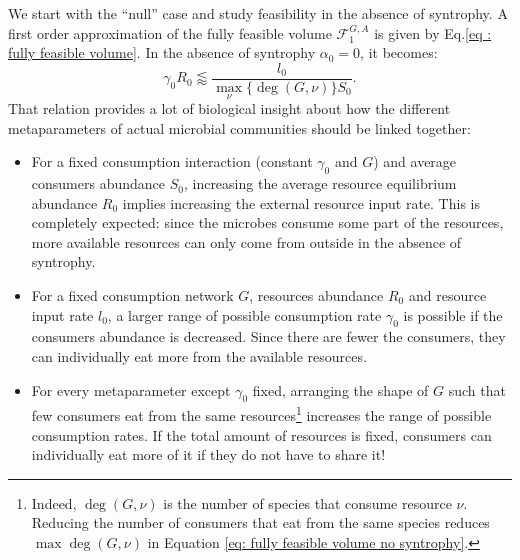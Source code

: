 \documentclass[12pt, titlepage]{report}
\begin{document}
We start with the ``null'' case and study feasibility in the absence of syntrophy. A first order approximation of the fully feasible volume $\mathcal{F}^{G,A}_1$ is given by Eq.\eqref{eq : fully feasible volume}.
In the absence of syntrophy $\alpha_0=0$, it becomes:
\begin{equation}
\gamma_0 R_0 \lessapprox \frac{l_0}{\max_\nu\{\deg(G,\nu)\}S_0}. \label{eq: fully feasible volume no syntrophy}
\end{equation}
That relation provides a lot of biological insight about how the different metaparameters of actual microbial communities should be linked together:
\begin{itemize}
\item For a fixed consumption interaction (\ie constant $\gamma_0$ and $G$) and average consumers abundance $S_0$, increasing the average resource equilibrium abundance $R_0$ implies increasing the external resource input rate. This is completely expected: since the microbes consume some part of the resources, more available resources can only come from outside in the absence of syntrophy.
\item For a fixed consumption network $G$, resources abundance $R_0$ and resource input rate $l_0$, a larger range of possible consumption rate $\gamma_0$ is possible if the consumers abundance is decreased. Since there are fewer the consumers, they can individually eat more from the available resources.
\item For every metaparameter except $\gamma_0$ fixed, arranging the shape of $G$ such that few consumers eat from the same resources\footnote{Indeed, $\deg(G,\nu)$ is the number of species that consume resource $\nu$. Reducing the number of consumers that eat from the same species reduces $\max{\deg(G,\nu)}$ in Equation \eqref{eq: fully feasible volume no syntrophy}.} increases the range of possible consumption rates. If the total amount of resources is fixed, consumers can individually eat more of it if they do not have to share it!
\end{itemize}
\end{document}
